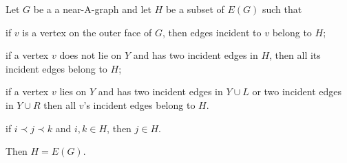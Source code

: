 \documentclass{patmorin}
\begin{document}
\begin{lem}
  Let $G$ be a a near-A-graph and let $H$
  be a subset of $E(G)$ such that
   \begin{compactenum}
    \item if $v$ is a vertex on the outer face 
      of $G$, then edges incident to $v$ belong to $H$;
    \item
if a vertex $v$ does not lie on $Y$ and has two incident edges in
$H$,
then all its incident edges belong to $H$;
    \item
if a vertex $v$ lies on $Y$ and has two incident edges in
$Y\cup L$ or two incident edges in $Y\cup R$
then all $v$'s incident edges belong to $H$.
    \item if $i \prec j \prec k$ and $i,k\in H$, 
      then $j\in H$.
   \end{compactenum}
   Then $H=E(G)$.
\end{lem}
\end{document}
